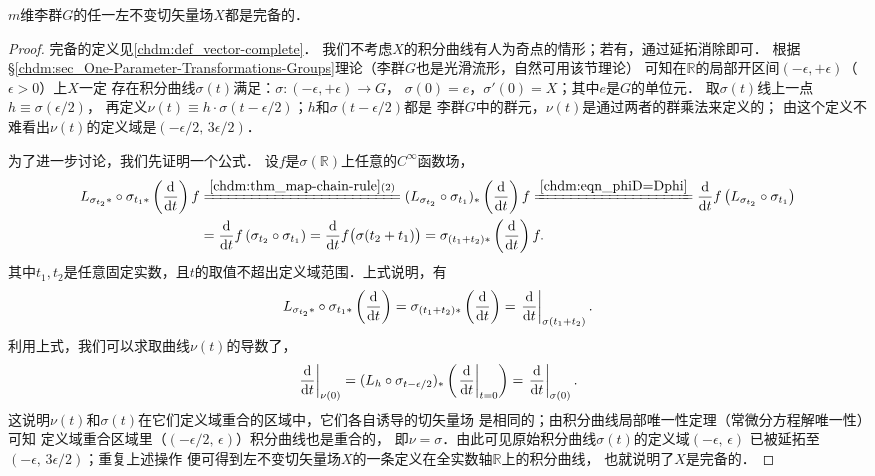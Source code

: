\begin{theorem}\label{chlg:thm_comlv}
    $m$维李群$G$的任一左不变切矢量场$X$都是完备的．
\end{theorem}
\begin{proof}
    完备的定义见\ref{chdm:def_vector-complete}．
    我们不考虑$X$的积分曲线有人为奇点的情形；若有，通过延拓消除即可．
    根据\S \ref{chdm:sec_One-Parameter-Transformations-Groups}理论（李群$G$也是光滑流形，自然可用该节理论）
    可知在$\mathbb{R}$的局部开区间$(-\epsilon,+\epsilon)$（$\epsilon>0$）上$X$一定
    存在积分曲线$\sigma(t)$满足：$\sigma:(-\epsilon,+\epsilon) \to G$，
    $\sigma(0)=e$，$\sigma'(0)=X$；其中$e$是$G$的单位元．
    取$\sigma(t)$线上一点$h\equiv \sigma(\epsilon/2)$，
    再定义$\nu(t)\equiv h\cdot \sigma(t-\epsilon/2)$；$h$和$\sigma(t-\epsilon/2)$都是
    李群$G$中的群元，$\nu(t)$是通过两者的群乘法来定义的；
    由这个定义不难看出$\nu(t)$的定义域是$(-\epsilon/2,\, 3\epsilon/2) $．
    
    为了进一步讨论，我们先证明一个公式．
    设$f$是$\sigma(\mathbb{R})$上任意的$C^\infty$函数场，
    \begin{align*}
        L_{\sigma_{t_2}*}\circ \sigma_{t_1*}\left(\frac{{\rm d}}{{\rm d}t}\right)f 
        &\xlongequal{\ref{chdm:thm_map-chain-rule}(2)}
        (L_{\sigma_{t_2}}\circ \sigma_{t_1})_{*}\left(\frac{{\rm d}}{{\rm d}t}\right)f 
        \xlongequal{\ref{chdm:eqn_phiD=Dphi}}
        \frac{{\rm d}}{{\rm d}t}f\left(L_{\sigma_{t_2}}\circ \sigma_{t_1}\right) \\
        &=\frac{{\rm d}}{{\rm d}t}f\left(\sigma_{t_2}\circ \sigma_{t_1}\right)
        =\frac{{\rm d}}{{\rm d}t}f\bigl(\sigma({t_2+t_1})\bigr)
        =\sigma_{(t_1+t_2)*}\left(\frac{{\rm d}}{{\rm d}t}\right)f.
    \end{align*}
    其中$t_1,t_2$是任意固定实数，且$t$的取值不超出定义域范围．上式说明，有
    \begin{equation}\label{chlg:eqn_lst}
        L_{\sigma_{t_2}*}\circ\sigma_{t_1*}\left(\frac{{\rm d}}{{\rm d}t}\right)
        =\sigma_{(t_1+t_2)*}\left(\frac{{\rm d}}{{\rm d}t}\right)
        =\left. \frac{{\rm d}}{{\rm d}t}\right|_{\sigma(t_1+t_2)}.
    \end{equation}
    利用上式，我们可以求取曲线$\nu(t)$的导数了，
    \begin{equation}
        \left. \frac{{\rm d}}{{\rm d}t}\right|_{\nu(0)} = 
        (L_{h}\circ \sigma_{t-\epsilon/2})_{*}
        \left(\left. \frac{{\rm d}}{{\rm d}t}\right|_{t=0}\right)
        =\left. \frac{{\rm d}}{{\rm d}t}\right|_{\sigma(0)} .
    \end{equation}
    这说明$\nu(t)$和$\sigma(t)$在它们定义域重合的区域中，它们各自诱导的切矢量场
    是相同的；由积分曲线局部唯一性定理（常微分方程解唯一性）可知
    定义域重合区域里（$(-\epsilon/2,\, \epsilon)$）积分曲线也是重合的，
    即$\nu = \sigma$．由此可见原始积分曲线$\sigma(t)$的定义域$(-\epsilon,\, \epsilon) $
    已被延拓至$(-\epsilon,\, 3\epsilon/2) $；重复上述操作
    便可得到左不变切矢量场$X$的一条定义在全实数轴$\mathbb{R}$上的积分曲线，
    也就说明了$X$是完备的．
\end{proof}


